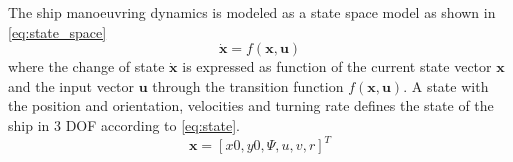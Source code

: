 The ship manoeuvring dynamics is modeled as a state space model as shown in \autoref{eq:state_space}
\begin{equation}
    \dot{\mathbf{x}}=f(\mathbf{x},\mathbf{u})
    \label{eq:state_space}
\end{equation}
where the change of state $\dot{\mathbf{x}}$ is expressed as function of the current state vector $\mathbf{x}$ and the input vector $\mathbf{u}$ through the transition function $f(\mathbf{x},\mathbf{u})$. A state with the position and orientation, velocities and turning rate defines the state of the ship in 3 DOF according to \autoref{eq:state}. 
\begin{equation}
    \mathbf{x} = [x0,y0,\Psi, u,v,r]^T
    \label{eq:state}
\end{equation}
